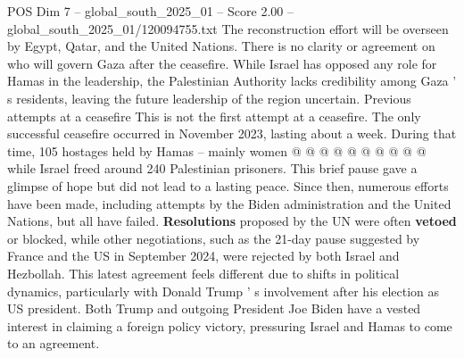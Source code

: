 \begin{textsample}{POS Dim 7 – global\_south\_2025\_01 – Score 2.00 – global\_south\_2025\_01/120094755.txt}
The reconstruction effort will be overseen by Egypt, Qatar, and the United Nations.
There is no clarity or agreement on who will govern Gaza after the ceasefire.
While Israel has opposed any role for Hamas in the leadership, the Palestinian Authority lacks credibility among Gaza ' s residents, leaving the future leadership of the region uncertain.
Previous attempts at a ceasefire This is not the first attempt at a ceasefire.
The only successful ceasefire occurred in November 2023, lasting about a week.
During that time, 105 hostages held by Hamas -- mainly women @ @ @ @ @ @ @ @ @ @ while Israel freed around 240 Palestinian prisoners.
This brief pause gave a glimpse of hope but did not lead to a lasting peace.
Since then, numerous efforts have been made, including attempts by the Biden administration and the United Nations, but all have failed. \textbf{Resolutions} proposed by the UN were often \textbf{vetoed} or blocked, while other negotiations, such as the 21-day pause suggested by France and the US in September 2024, were rejected by both Israel and Hezbollah.
This latest agreement feels different due to shifts in political dynamics, particularly with Donald Trump ' s involvement after his election as US president.
Both Trump and outgoing President Joe Biden have a vested interest in claiming a foreign policy victory, pressuring Israel and Hamas to come to an agreement.

\end{textsample}
